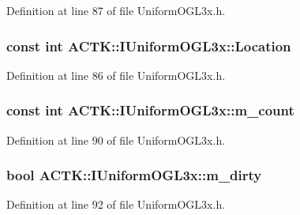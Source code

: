 Definition at line 87 of file Uniform\-O\-G\-L3x.\-h.

\hypertarget{class_a_c_t_k_1_1_i_uniform_o_g_l3x_ab0346a19e03f102ae1e93481030f453e}{
\subsubsection[{Location}]{\setlength{\rightskip}{0pt plus 5cm}const {\bf int} A\-C\-T\-K\-::\-I\-Uniform\-O\-G\-L3x\-::\-Location}}\label{class_a_c_t_k_1_1_i_uniform_o_g_l3x_ab0346a19e03f102ae1e93481030f453e}


Definition at line 86 of file Uniform\-O\-G\-L3x.\-h.

\hypertarget{class_a_c_t_k_1_1_i_uniform_o_g_l3x_a30e73dca5d3fd5c1c517361ffb6865c3}{
\subsubsection[{m\-\_\-count}]{\setlength{\rightskip}{0pt plus 5cm}const {\bf int} A\-C\-T\-K\-::\-I\-Uniform\-O\-G\-L3x\-::m\-\_\-count\hspace{0.3cm}{\ttfamily [protected]}}}\label{class_a_c_t_k_1_1_i_uniform_o_g_l3x_a30e73dca5d3fd5c1c517361ffb6865c3}


Definition at line 90 of file Uniform\-O\-G\-L3x.\-h.

\hypertarget{class_a_c_t_k_1_1_i_uniform_o_g_l3x_a9115ae3cdd3db04e2027e297d7df6700}{
\subsubsection[{m\-\_\-dirty}]{\setlength{\rightskip}{0pt plus 5cm}bool A\-C\-T\-K\-::\-I\-Uniform\-O\-G\-L3x\-::m\-\_\-dirty\hspace{0.3cm}{\ttfamily [protected]}}}\label{class_a_c_t_k_1_1_i_uniform_o_g_l3x_a9115ae3cdd3db04e2027e297d7df6700}


Definition at line 92 of file Uniform\-O\-G\-L3x.\-h.

